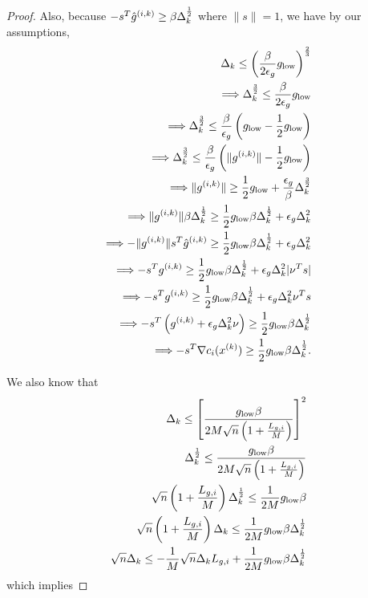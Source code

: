 \begin{proof}
Also, because $-s^T {{\hat g}^{(i, k)}} \ge \beta \Delta_k^{\frac 1 2}$ where $\|s\| = 1$, we have by our assumptions,
\begin{align*}
\Delta_k \le \left(\frac{\beta}{2\epsilon_{g}}g_{\text{low}}\right)^{\frac 2 3} \\
\Longrightarrow \Delta_k^{\frac 3 2} \le \frac{\beta}{2\epsilon_{g}}g_{\text{low}} \\
\Longrightarrow \Delta_k^{\frac 3 2} \le \frac{\beta}{\epsilon_{g}}\left(g_{\text{low}} - \frac 1 2 g_{\text{low}}\right) \\
\Longrightarrow \Delta_k^{\frac 3 2} \le \frac{\beta}{\epsilon_{g}}\left(\|{g^{(i, k)}}\| - \frac 1 2 g_{\text{low}}\right) \\
\Longrightarrow \|{g^{(i, k)}}\| \ge \frac 1 2 g_{\text{low}} + \frac{\epsilon_{g}}{\beta}\Delta_k^{\frac 3 2} \\
\Longrightarrow \|{g^{(i, k)}}\|\beta\Delta_k^{\frac 1 2} \ge \frac 1 2 g_{\text{low}} \beta \Delta_k^{\frac 1 2} + \epsilon_{g}\Delta_k^2 \\
\Longrightarrow -\|{g^{(i, k)}}\|s^T{{\hat g}^{(i, k)}} \ge \frac 1 2 g_{\text{low}} \beta \Delta_k^{\frac 1 2 } + {\epsilon_{g}\Delta_k^2}  \\
\Longrightarrow -s^T{g^{(i, k)}} \ge \frac 1 2 g_{\text{low}} \beta \Delta_k^{\frac 1 2} + \epsilon_{g}\Delta_k^2|\nu^T s| \\
\Longrightarrow -s^T{g^{(i, k)}} \ge \frac 1 2 g_{\text{low}} \beta \Delta_k^{\frac 1 2} + \epsilon_{g}\Delta_k^2\nu^T s \\
\Longrightarrow -s^T\left({g^{(i, k)}} + \epsilon_{g}\Delta_k^2\nu\right) \ge \frac 1 2 g_{\text{low}} \beta \Delta_k^{\frac 1 2} \\
\Longrightarrow -s^T\nabla c_i({x^{(k)}}) \ge \frac 1 2 g_{\text{low}} \beta \Delta_k^{\frac 1 2}.
\end{align*}


We also know that
\begin{align*}
\Delta_k \le \left[\frac {g_{\text{low}} \beta} {2M\sqrt{n}\left(1 + \frac {{L_{g, i}}} M \right)} \right]^2 \\
\Delta_k^{\frac 1 2} \le \frac {g_{\text{low}} \beta} {2M\sqrt{n}\left(1 + \frac {{L_{g, i}}} M \right)}  \\
\sqrt{n}\left(1 + \frac {{L_{g, i}}} M \right) \Delta_k^{\frac 1 2} \le \frac 1 {2M} g_{\text{low}} \beta \\
\sqrt{n}\left(1 + \frac {{L_{g, i}}} M \right) \Delta_k \le \frac 1 {2M} g_{\text{low}} \beta \Delta_k^{\frac 1 2} \\
\sqrt{n} \Delta_k \le -\frac 1 M \sqrt{n}\Delta_k {L_{g, i}} + \frac 1 {2M} g_{\text{low}} \beta \Delta_k^{\frac 1 2} \\
\end{align*}
which implies


\end{proof}
